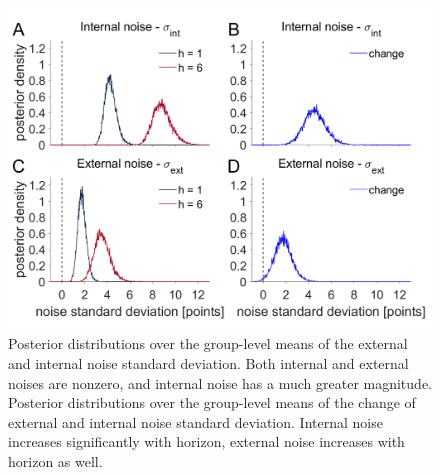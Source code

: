 \documentclass[12pt]{article}
\begin{document}
	
	\begin{figure}[H]
		\begin{center}
			\includegraphics[width=1\textwidth]{figures/hyperprior.png}
			\caption[Posterior distributions over the group-level noise standard deviation of the external and internal noise variance.]{Posterior distributions over the group-level means of the external and internal noise standard deviation. Both internal and external noises are nonzero, and internal noise has a much greater magnitude. Posterior distributions over the group-level means of the change of external and internal noise standard deviation. Internal noise increases significantly with horizon, external noise increases with horizon as well.}
			\label{fig:mb1}
		\end{center}
	\end{figure}
	
	
	
	
	
	
\end{document}

